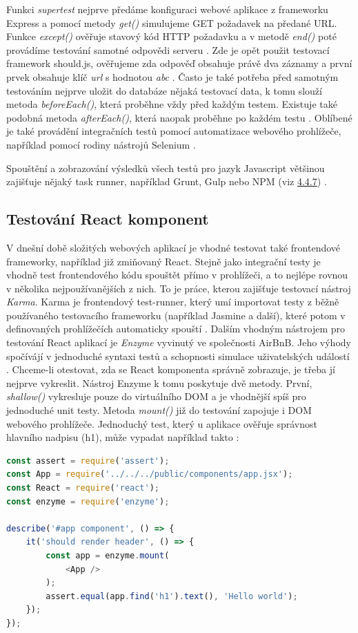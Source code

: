 Funkci \textit{supertest} nejprve předáme konfiguraci webové aplikace z frameworku Express a pomocí metody \textit{get()} simulujeme GET požadavek na předané URL. Funkce \textit{except()} ověřuje stavový kód HTTP požadavku a v metodě \textit{end()} poté provádíme testování samotné odpovědi serveru \cite{zdrojak_jstesting} \cite{jstesting}. Zde je opět použit testovací framework should.js, ověřujeme zda odpověď obsahuje právě dva záznamy a první prvek obsahuje klíč \textit{url} s hodnotou \textit{abc} \cite{should_js}.  Často je také potřeba před samotným testováním nejprve uložit do databáze nějaká testovací data, k tomu slouží metoda \textit{beforeEach()}, která proběhne vždy před každým testem. Existuje také podobná metoda \textit{afterEach()}, která naopak proběhne po každém testu \cite{zdrojak_jstesting} \cite{jstesting}. Oblíbené je také provádění integračních testů pomocí automatizace webového prohlížeče, například pomocí rodiny nástrojů Selenium \cite{selenium}.

Spouštění a zobrazování výsledků všech testů pro jazyk Javascript většinou zajišťuje nějaký task runner, například Grunt, Gulp nebo NPM (viz \hyperref[sec:task_runners]{4.4.7}) \cite{jstesting}.

\subsection{Testování React komponent}
V dnešní době složitých webových aplikací je vhodné testovat také frontendové frameworky, například již zmiňovaný React. Stejně jako integrační testy je vhodně test frontendového kódu spouštět přímo v prohlížeči, a to nejlépe rovnou v několika nejpoužívanějších z nich. To je práce, kterou zajišťuje testovací nástroj \textit{Karma}. Karma je frontendový test-runner, který umí importovat testy z běžně používaného testovacího frameworku (například Jasmine a další), které potom v definovaných prohlížečích automaticky spouští \cite{karma}. Dalším vhodným nástrojem pro testování React aplikací je \textit{Enzyme} vyvinutý ve společnosti AirBnB. Jeho výhody spočívájí v jednoduché syntaxi testů a schopnosti simulace uživatelských událostí \cite{enzyme} \cite{testing_react}. Chceme-li otestovat, zda se React komponenta správně zobrazuje, je třeba jí nejprve vykreslit. Nástroj Enzyme k tomu poskytuje dvě metody. První, \textit{shallow()} vykresluje pouze do virtuálního DOM a je vhodnější spíš pro jednoduché unit testy. Metoda \textit{mount()} již do testování zapojuje i DOM webového prohlížeče. Jednoduchý test, který u aplikace ověřuje správnost hlavního nadpisu (h1), může vypadat například takto \cite{enzyme} \cite{testing_react}:

\begin{lstlisting}[language=Javascript,caption={Ukázka testu React komponenty App \cite{testing_react}}]
const assert = require('assert');  
const App = require('../../../public/components/app.jsx');  
const React = require('react');  
const enzyme = require('enzyme');

describe('#app component', () => {  
    it('should render header', () => {
        const app = enzyme.mount(
            <App />
        );
        assert.equal(app.find('h1').text(), 'Hello world');
    });
});
\end{lstlisting}
